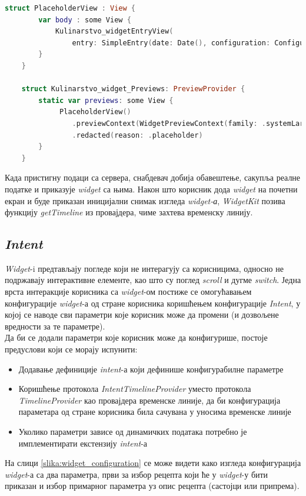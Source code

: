 \documentclass[12pt,oneside]{memoir}
\begin{document}
\begin{lstlisting}[caption=\textit{{Widget - placeholder}}, label={lst:Widget - placeholder}, language=Swift, frame=single]
    struct PlaceholderView : View {
        var body : some View {
            Kulinarstvo_widgetEntryView(
                entry: SimpleEntry(date: Date(), configuration: ConfigurationIntent(), recipe: Datafeed.shared.favRecipes[0], parameterToShow: MainParameter.Sastojci.rawValue))
        }
    }
    
    struct Kulinarstvo_widget_Previews: PreviewProvider {
        static var previews: some View {
             PlaceholderView()
                .previewContext(WidgetPreviewContext(family: .systemLarge))
                .redacted(reason: .placeholder)
        }
    }
\end{lstlisting}

\indent Када пристигну подаци са сервера, снабдевач добија обавештење, сакупља реалне податке и приказује \textit{widget} са њима. Након што корисник дода \textit{widget} на почетни екран и буде приказан иницијални снимак изгледа \textit{widget-а}, \textit{WidgetKit} позива функцију \textit{getTimeline} из провајдера, чиме захтева временску линију.

\subsection{\textit{Intent}}
\label{subsec:Intent}
\indent \textit{Widget}-i предтављају погледе који не интерагују са корисницима, односно не подржавају интерактивне елементе, као што су поглед \textit{scroll} и дугме \textit{switch}. Једна врста интеракције корисника са \textit{widget}-ом постиже се омогућавањем конфигурације \textit{widget}-а од стране корисника коришћењем конфигурације \textit{Intent}, у којој се наводе сви параметри које корисник може да промени (и дозвољене вредности за те параметре). 
\\
\indent Да би се додали параметри које корисник може да конфигурише, постоје предуслови који се морају испунити:
\begin{itemize}
    \item Додавање дефиниције \textit{intent}-а који дефинише конфигурабилне параметре 
    \item Коришћење протокола \textit{IntentTimelineProvider} уместо протокола \textit{TimelineProvider} као провајдера временске линије, да би конфигурација параметара од стране корисника била сачувана у уносима временске линије
    \item Уколико параметри зависе од динамичких података потребно је имплементирати екстензију \textit{intent}-а
\end{itemize}
На слици \ref{slika:widget_configuration} се може видети како изгледа конфигурација \textit{widget}-а са два параметра, први за избор рецепта који ће у \textit{widget}-у бити приказан и избор примарног параметра уз опис рецепта (састојци или припрема).
\end{document}
